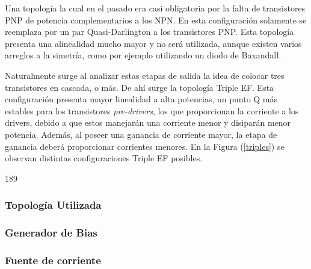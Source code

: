 Una topología la cual en el pasado era casi obligatoria por la falta de transistores PNP de potencia complementarios a los NPN. En esta configuración solamente se reemplaza por un par Quasi-Darlington a los transistores PNP. Esta topología presenta una alinealidad mucho mayor y no será utilizada, aunque existen varios arreglos a la simetría, como por ejemplo utilizando un diodo de Baxandall.

Naturalmente surge al analizar estas etapas de salida la idea de colocar tres transistores en cascada, o más. De ahí surge la topología Triple EF. Esta configuración presenta mayor linealidad a alta potencias, un punto Q más estables para los transistores \textit{pre-drivers}, los que proporcionan la corriente a los drivers, debido a que estos manejarán una corriente menor y disiparán menor potencia. Además, al poseer una ganancia de corriente mayor, la etapa de ganancia deberá proporcionar corrientes menores. En la Figura (\ref{triples}) se observan distintas configuraciones Triple EF posibles.

189

\subsubsection{Topología Utilizada}


\subsubsection{Generador de Bias}

\subsubsection{Fuente de corriente}


